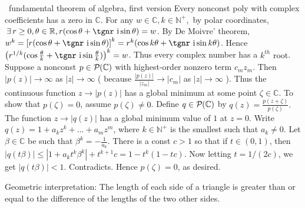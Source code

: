 \documentclass[a4paper, 11pt, UTF8]{article}
\def\i{{\textup{\tgnr i}}}
\def\Rbb{{\mathbb{R}}}
\def\Cbb{{\mathbb{C}}}
\def\Nbp{{\mathbb{N}^+}}
\def\BulletPoint{{\small\bullet}}
\begin{document}
\begin{large}
\BulletPoint \,\hspace{1pt}\NoteFor{[4.13]} {\tgsl fundamental theorem of algebra, first version}\TextB{}
{\tgsl Every nonconst poly with complex coefficients has a zero in $\Cbb$.} 
For any $w\in\Cbb,k\in\Nbp,$ by polar coordinates, $\,\exists\,r\geq 0,\theta\in\Rbb,r(\cos\theta + \i \sin\theta) = w$.\TextB{}
By De Moivre' theorem, $w^k=\left[r(\cos\theta +\i\sin \theta)\right]^k=r^k(\cos k\theta + \i \sin k\theta)$.\TextB{}
Hence $\left(r^{1/k}(\cos\frac{\theta}{k} +\i\sin\frac{\theta}{k})\right)^k=w$. Thus every complex number has a {\tgsl $k^{th}$ root}.\vspace{5pt}\TextB{}
Suppose a nonconst $p\in\PoC{}$ with highest-order nonzero term $c_m z_m$.\TextB{}
Then $\left|p(z)\right|\rightarrow\infty$ as $\left|z\right|\rightarrow\infty$ ( because $\displaystyle\frac{\left|p(z)\right|}{\left|z_m\right|}\rightarrow\left|c_m\right|$ as $\left|z\right|\rightarrow\infty$ ).\TextB{}
\vspace{3pt}Thus the continuous function $z\rightarrow\left|p(z)\right|$ has a global minimum at some point $\zeta\in\Cbb.$\TextB{}
\vspace{3pt}To show that $p(\zeta) = 0$, assume $p(\zeta)\neq 0$. Define $q\in\PoC{}$ by $q(z)=\displaystyle\frac{p(z+\zeta)}{p(\zeta)}.$\TextB{}
The function $z\rightarrow\left|q(z)\right|$ has a global minimum value of $1$ at $z = 0$.\TextB{}
Write $q(z) = 1 + a_k z^k + \dots + a_m z^m$, where $k\in\Nbp$ is the smallest such that $a_k\neq 0$.\TextB{}
Let $\beta\in\Cbb$ be such that $\displaystyle\beta^k=-\frac{1}{a_k}$.\TextB{}
There is a const $c > 1$ so that if
$t\in (0, 1)$, then $\left|q(t\beta)\right|\leq\left|1 + a_k t^k\beta^k\right|+t^{k+1}c = 1 - t^k (1 - tc)$.\TextB{}
Now letting $t=1/(2c)$, we get $\left|q(t\beta)\right| < 1$. Contradicts. Hence $p(\zeta) = 0$, as desired.\PfEnd
\SepLine

\ProblemB{
	\TextB{Prove that if $w,z\in\Cbb,$ then $\left||w|-|z|\right|\leq\left|w-z\right|$.}
}\vspace{-8pt}\PfEnd
{\tgsl\footnotesize Geometric interpretation: The length of each side of a triangle is greater than or equal to the difference of the lengths of the two other sides.}\par
\SepLine


\end{large}
\end{document}
